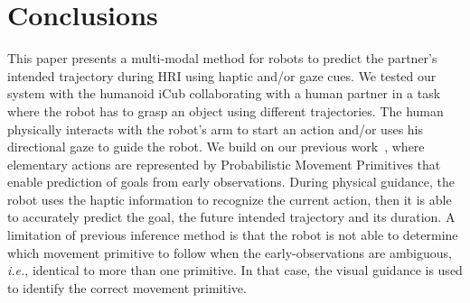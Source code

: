 \documentclass[runningheads,a4paper]{llncs}
\begin{document}
\section{Conclusions}
\label{sec:ccl}
This paper presents a multi-modal method for robots to predict the partner's intended trajectory during HRI using haptic and/or gaze cues. 
We tested our system with the humanoid iCub collaborating with a human partner in a task where the robot has to grasp an object using different trajectories. 
The human physically interacts with the robot's arm to start an action and/or uses his directional gaze to guide the robot.
We build on our previous work~\cite{oriane2017}, where elementary actions are represented by Probabilistic Movement Primitives that enable prediction of goals from early observations. During physical guidance, the robot uses the haptic information to recognize the current action, then it is able to accurately predict the goal, the future intended trajectory and its duration. 
A limitation of previous inference method is that the robot is not able to determine which movement primitive to follow when the early-observations are ambiguous, \textit{i.e.}, identical to more than one primitive. In that case, the visual guidance is used to identify the correct movement primitive.
\end{document}

